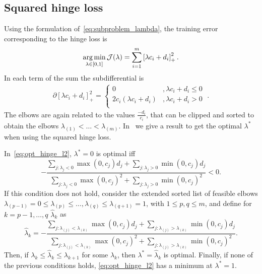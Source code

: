 \subsection{Squared hinge loss}
Using the formulation of~\eqref{eq:subproblem_lambda}, the training error corresponding to the hinge loss is
\begin{equation}
    \label{eq:opt_hinge_l2}
    \argmin_{\lambda \in [0, 1]} \mathcal{J}(\lambda) = \sum_{i=1}^{\npertask} \pospart{\lambda c_i + d_i}^2.
\end{equation}
In each term of the sum the subdifferential is 
\begin{align*}
    \partial \left[\lambda c_i + d_i \right]_+^2 = 
    \begin{cases}
        0 &, \lambda c_i + d_i  \leq 0 \\
        2 c_i (\lambda c_i + d_i) &, \lambda c_i + d_i  > 0 \\
    \end{cases} \; .
\end{align*}
The elbows are again related to the values $\frac{-d_i}{c_i}$, that can be clipped and sorted to obtain the elbows ${\lambda}_{(1)} < \ldots < {\lambda}_{(m)}$.
In~\citet[Proposition 2]{RuizAD21} we give a result to get the optimal $\lambda^*$ when using the squared hinge loss.
\begin{prop}\label{prop:sqhinge_neurocom2020}
    In~\eqref{eq:opt_hinge_l2},
    $\lambda^*=0$ is optimal iff 
    \begin{equation}\nonumber
         - \frac{\sum_{j: \lambda_{j} < 0} \max(0, c_{j}) d_{j} + \sum_{j: \lambda_{j} > 0} \min(0, c_{j}) d_{j}}{\sum_{j: \lambda_{j} < 0} \max(0, c_{j})^2 + \sum_{j: \lambda_{j} > 0} \min(0, c_{j})^2} < 0.
       \end{equation}
    If this condition does not hold, 
    consider the extended sorted list of feasible elbows $\lambda_{(p-1)} = 0 \leq \lambda_{(p)} \leq \ldots, \lambda_{(q)} \leq \lambda_{(q+1)}=1$, with $1 \leq p, q \leq m$, and
    define for $k=p-1, \ldots,  q$ $\widehat{\lambda}_k$ as %
\begin{equation}\label{sol_hinge_2}
 \widehat{\lambda}_k = - \frac{\sum_{j: \lambda_{(j)} < \lambda_{(k)}} \max(0, c_{j}) d_{j} + \sum_{j: \lambda_{(j)} > \lambda_{(k)}} \min(0, c_{j}) d_{j}}{\sum_{j: \lambda_{(j)} < \lambda_{(k)}} \max(0, c_{j})^2 + \sum_{j: \lambda_{(j)} > \lambda_{(k)}} \min(0, c_{j})^2} .
\end{equation}
%
Then, if $\lambda_k \leq \widehat{\lambda}_k \leq  \lambda_{k+1}$ for some $\widehat{\lambda}_k$, then $\lambda^* = \widehat{\lambda}_k$ is optimal.
Finally, if none of the previous conditions holds, \eqref{eq:opt_hinge_l2} has a minimum at $\lambda^* = 1$.
\end{prop}




